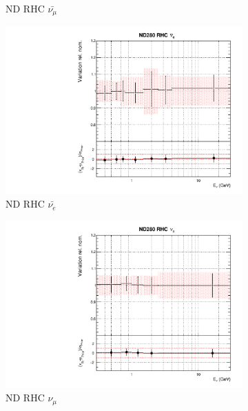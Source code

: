 \begin{figure}
\begin{subfigure}{0.24\textwidth}
  \caption{ND RHC $\bar{\nu_{\mu}}$}
  \label{fig:}
\end{subfigure}
\begin{subfigure}{0.24\textwidth}
  \centering
  \includegraphics[width=0.95\linewidth]{figs/asmvflux5}
  \caption{ND RHC $\bar{\nu_{e}}$}
  \label{fig:}
\end{subfigure}
\begin{subfigure}{0.24\textwidth}
  \centering
  \includegraphics[width=0.95\linewidth]{figs/asmvflux6}
  \caption{ND RHC $\nu_{\mu}$}
  \label{fig:}
\end{subfigure}
\vspace{15mm}
\begin{subfigure}{0.24\textwidth}
  \centering

\end{subfigure}
\end{figure}
